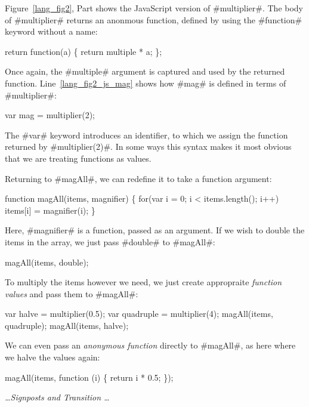 \documentclass[12pt]{report}
\begin{document}
Figure~\ref{lang_fig2}, Part  shows the JavaScript
version of #multiplier#. The body of #multiplier# returns an anonmous
function, defined by using the #function# keyword without a name:
\begin{AVerb}
  return function(a) \{ 
    return multiple * a;
  \};
\end{AVerb}

Once again, the #multiple# argument is captured and used by the
returned function. Line~\ref{lang_fig2_js_mag} shows how #mag#
is defined in terms of #multiplier#:

\begin{AVerb}
  var mag = multiplier(2);
\end{AVerb}

The #var# keyword introduces an identifier, to which we assign the
function returned by #multiplier(2)#. In some ways this syntax makes
it most obvious that we are treating functions as values.

Returning to #magAll#, we can redefine it to take a function argument:
\begin{AVerb}
function magAll(items, magnifier) \{
  for(var i = 0; i < items.length(); i++)
    items[i] = magnifier(i);
\}
\end{AVerb}
Here, #magnifier# is a function, passed as an argument. If 
we wish to double the items in the array, we just pass #double#
to #magAll#:
\begin{AVerb}
  magAll(items, double);
\end{AVerb}
To multiply the items however we need, we just create appropraite
\emph{function values} and pass them to #magAll#:
\begin{AVerb}
  var halve = multiplier(0.5);
  var quadruple = multiplier(4);
  magAll(items, quadruple);
  magAll(items, halve);
\end{AVerb}
We can even pass an \emph{anonymous function} directly to 
#magAll#, as here where we halve the values again:
\begin{AVerb}
  magAll(items, function (i) \{ return i * 0.5; \});
\end{AVerb}

\emph{\ldots Signposts and Transition \ldots}

\end{document}
